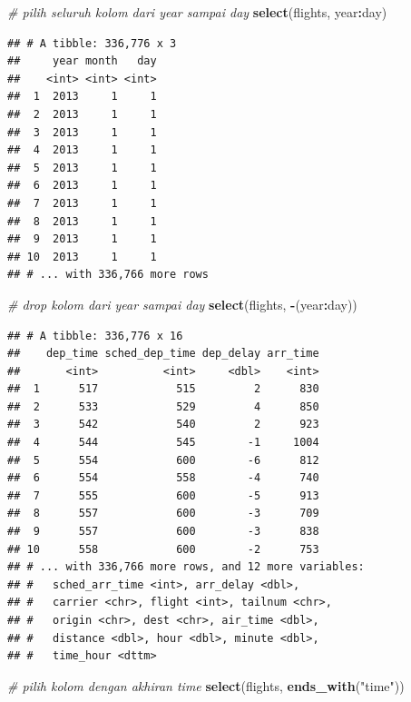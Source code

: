 \documentclass[]{book}
\newenvironment{Shaded}{\begin{snugshade}}{\end{snugshade}}
\newcommand{\KeywordTok}[1]{\textcolor[rgb]{0.13,0.29,0.53}{\textbf{#1}}}
\newcommand{\StringTok}[1]{\textcolor[rgb]{0.31,0.60,0.02}{#1}}
\newcommand{\CommentTok}[1]{\textcolor[rgb]{0.56,0.35,0.01}{\textit{#1}}}
\newcommand{\OperatorTok}[1]{\textcolor[rgb]{0.81,0.36,0.00}{\textbf{#1}}}
\newcommand{\NormalTok}[1]{#1}
\begin{document}
\begin{Shaded}
\begin{Highlighting}[]
\CommentTok{# pilih seluruh kolom dari year sampai day}
\KeywordTok{select}\NormalTok{(flights, year}\OperatorTok{:}\NormalTok{day)}
\end{Highlighting}
\end{Shaded}

\begin{verbatim}
## # A tibble: 336,776 x 3
##     year month   day
##    <int> <int> <int>
##  1  2013     1     1
##  2  2013     1     1
##  3  2013     1     1
##  4  2013     1     1
##  5  2013     1     1
##  6  2013     1     1
##  7  2013     1     1
##  8  2013     1     1
##  9  2013     1     1
## 10  2013     1     1
## # ... with 336,766 more rows
\end{verbatim}

\begin{Shaded}
\begin{Highlighting}[]
\CommentTok{# drop kolom dari year sampai day}
\KeywordTok{select}\NormalTok{(flights, }\OperatorTok{-}\NormalTok{(year}\OperatorTok{:}\NormalTok{day))}
\end{Highlighting}
\end{Shaded}

\begin{verbatim}
## # A tibble: 336,776 x 16
##    dep_time sched_dep_time dep_delay arr_time
##       <int>          <int>     <dbl>    <int>
##  1      517            515         2      830
##  2      533            529         4      850
##  3      542            540         2      923
##  4      544            545        -1     1004
##  5      554            600        -6      812
##  6      554            558        -4      740
##  7      555            600        -5      913
##  8      557            600        -3      709
##  9      557            600        -3      838
## 10      558            600        -2      753
## # ... with 336,766 more rows, and 12 more variables:
## #   sched_arr_time <int>, arr_delay <dbl>,
## #   carrier <chr>, flight <int>, tailnum <chr>,
## #   origin <chr>, dest <chr>, air_time <dbl>,
## #   distance <dbl>, hour <dbl>, minute <dbl>,
## #   time_hour <dttm>
\end{verbatim}

\begin{Shaded}
\begin{Highlighting}[]
\CommentTok{# pilih kolom dengan akhiran time}
\KeywordTok{select}\NormalTok{(flights, }\KeywordTok{ends_with}\NormalTok{(}\StringTok{"time"}\NormalTok{))}
\end{Highlighting}
\end{Shaded}
\end{document}
